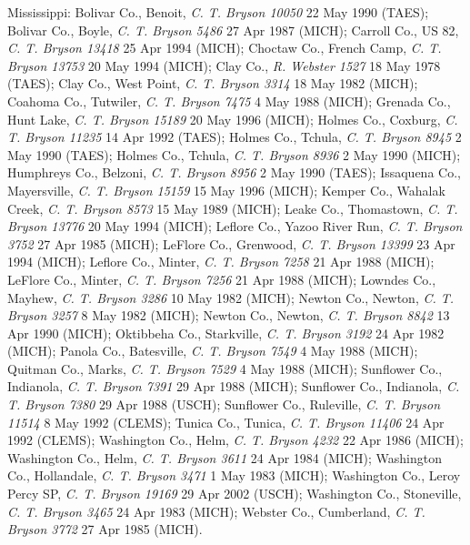 \documentclass{article}
\begin{document}
Mississippi:
Bolivar Co., Benoit, \textit{C. T. Bryson 10050} 22 May 1990 (TAES);
Bolivar Co., Boyle, \textit{C. T. Bryson 5486} 27 Apr 1987 (MICH);
Carroll Co., US 82, \textit{C. T. Bryson 13418} 25 Apr 1994 (MICH);
Choctaw Co., French Camp, \textit{C. T. Bryson 13753} 20 May 1994 (MICH);
Clay Co., \textit{R. Webster 1527} 18 May 1978 (TAES);
Clay Co., West Point, \textit{C. T. Bryson 3314} 18 May 1982 (MICH);
Coahoma Co., Tutwiler, \textit{C. T. Bryson 7475} 4 May 1988 (MICH);
Grenada Co., Hunt Lake, \textit{C. T. Bryson 15189} 20 May 1996 (MICH);
Holmes Co., Coxburg, \textit{C. T. Bryson 11235} 14 Apr 1992 (TAES);
Holmes Co., Tchula, \textit{C. T. Bryson 8945} 2 May 1990 (TAES);
Holmes Co., Tchula, \textit{C. T. Bryson 8936} 2 May 1990 (MICH);
Humphreys Co., Belzoni, \textit{C. T. Bryson 8956} 2 May 1990 (TAES);
Issaquena Co., Mayersville, \textit{C. T. Bryson 15159} 15 May 1996 (MICH);
Kemper Co., Wahalak Creek, \textit{C. T. Bryson 8573} 15 May 1989 (MICH);
Leake Co., Thomastown, \textit{C. T. Bryson 13776} 20 May 1994 (MICH);
Leflore Co., Yazoo River Run, \textit{C. T. Bryson 3752} 27 Apr 1985 (MICH);
LeFlore Co., Grenwood, \textit{C. T. Bryson 13399} 23 Apr 1994 (MICH);
Leflore Co., Minter, \textit{C. T. Bryson 7258} 21 Apr 1988 (MICH);
LeFlore Co., Minter, \textit{C. T. Bryson 7256} 21 Apr 1988 (MICH);
Lowndes Co., Mayhew, \textit{C. T. Bryson 3286} 10 May 1982 (MICH);
Newton Co., Newton, \textit{C. T. Bryson 3257} 8 May 1982 (MICH);
Newton Co., Newton, \textit{C. T. Bryson 8842} 13 Apr 1990 (MICH);
Oktibbeha Co., Starkville, \textit{C. T. Bryson 3192} 24 Apr 1982 (MICH);
Panola Co., Batesville, \textit{C. T. Bryson 7549} 4 May 1988 (MICH);
Quitman Co., Marks, \textit{C. T. Bryson 7529} 4 May 1988 (MICH);
Sunflower Co., Indianola, \textit{C. T. Bryson 7391} 29 Apr 1988 (MICH);
Sunflower Co., Indianola, \textit{C. T. Bryson 7380} 29 Apr 1988 (USCH);
Sunflower Co., Ruleville, \textit{C. T. Bryson 11514} 8 May 1992 (CLEMS);
Tunica Co., Tunica, \textit{C. T. Bryson 11406} 24 Apr 1992 (CLEMS);
Washington Co., Helm, \textit{C. T. Bryson 4232} 22 Apr 1986 (MICH);
Washington Co., Helm, \textit{C. T. Bryson 3611} 24 Apr 1984 (MICH);
Washington Co., Hollandale, \textit{C. T. Bryson 3471} 1 May 1983 (MICH);
Washington Co., Leroy Percy SP, \textit{C. T. Bryson 19169} 29 Apr 2002 (USCH);
Washington Co., Stoneville, \textit{C. T. Bryson 3465} 24 Apr 1983 (MICH);
Webster Co., Cumberland, \textit{C. T. Bryson 3772} 27 Apr 1985 (MICH).
\end{document}
